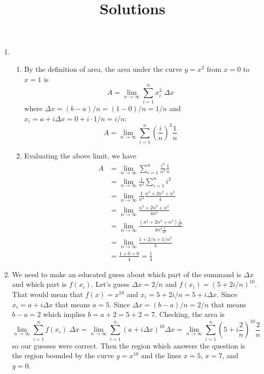 \documentclass{article}
\title{\commonPSTitleZeroFourOne\ Solutions}
\author{\commonAuthor}
\date{\commonDateZeroFourOne}
\begin{document}
\maketitle
\thispagestyle{plain}

\noindent
\begin{enumerate}
\item
  \begin{enumerate}
  \item By the definition of area, the area under the curve $y=x^3$
    from $x=0$ to $x=1$ is
    \begin{equation*}
      A = \lim_{n\to\infty} \sum_{i=1}^n x_i^3 \; \Delta x
    \end{equation*}
    where $\Delta x = (b-a)/n = (1-0)/n = 1/n$ and
    $x_i=a + i\Delta x = 0 + i \cdot 1/n = i/n$:
    \begin{equation*}
      A = \lim_{n\to\infty} \sum_{i=1}^n \left(\frac{i}{n}\right)^3
      \frac{1}{n}
    \end{equation*}
  \item Evaluating the above limit, we have
    \begin{align*}
      A &= \lim_{n\to\infty} \sum_{i=1}^n \frac{i^3}{n^3} \frac{1}{n}
      \\
        &= \lim_{n\to\infty} \frac{1}{n^4} \sum_{i=1}^n i^3
      \\
        &= \lim_{n\to\infty} \frac{1}{n^4} \frac{n^4 + 2n^3 + n^2}{4}
      \\
        &= \lim_{n\to\infty} \frac{n^4+2n^3+n^2}{4n^4}
      \\
        &=\lim_{n\to\infty} \frac{(n^4+2n^3+n^2)
          \frac{1}{n^4}}{4n^4\frac{1}{n^4}}
      \\
        &= \lim_{n\to\infty} \frac{1+2/n+1/n^2}{4}
      \\
        &= \frac{1+0+0}{4} = \frac{1}{4}
    \end{align*}
  \end{enumerate}
\item We need to make an educated guess about which part of the
  summand is $\Delta x$ and which part is $f(x_i)$.  Let's guess
  $\Delta x = 2/n$ and $f(x_i)= (5+2i/n)^{10}$.  That would mean that
  $f(x)=x^{10}$ and $x_i=5+2i/n = 5 + i\Delta x$.  Since
  $x_i=a+i\Delta x$ that means $a=5$.  Since $\Delta x = (b-a)/n =
  2/n$ that means $b-a = 2$ which implies $b=a+2=5+2=7$.  Checking,
  the area is
  \begin{equation*}
    \lim_{n\to\infty} \sum_{i=1}^n f(x_i) \;
    \Delta x = \lim_{n\to\infty} \sum_{i=1}^n \left(a + i\Delta
      x\right)^{10} \Delta x
    = \lim_{n\to\infty} \sum_{i=1}^n \left(5 + i \frac{2}{n}\right)^{10}
    \frac{2}{n}
  \end{equation*}
  so our guesses were correct.  Then the region which answers the
  question is the region bounded by the curve $y=x^{10}$ and the lines
  $x=5$, $x=7$, and $y=0$.
\end{enumerate}
\end{document}
